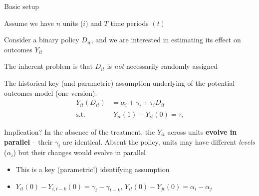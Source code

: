 \documentclass[notes,11pt, aspectratio=169]{beamer}
\newenvironment{wideitemize}{\itemize\addtolength{\itemsep}{10pt}}{\enditemize}
\begin{document}
\begin{frame}{Basic setup }
  \begin{wideitemize}
  \item Assume we have $n$ units ($i$) and $T$ time periods $(t)$
  \item Consider a binary policy $D_{it}$, and we are interested
    in estimating its effect on outcomes $Y_{it}$
  \item The inherent problem is that $D_{it}$ is \emph{not}
    necessarily randomly assigned
  \item The historical key (and parametric) assumption underlying of
    the potential outcomes model (one version):
    \begin{align*}
      Y_{it}(D_{it}) &= \alpha_{i} + \gamma_{t} + \tau_{i}D_{it}\\
      \text{s.t.} &\; Y_{it}(1) - Y_{it}(0)=  \tau_{i}
    \end{align*}
  \item Implication? In the absence of the treatment, the $Y_{it}$
    across units \textbf{evolve in parallel} -- their $\gamma_{t}$ are
    identical. Absent the policy, units may have different
    \emph{levels} ($\alpha_{i}$) but their changes would evolve in
    parallel
    \begin{itemize}
    \item This is a key (parametric!) identifying assumption
    \item $Y_{it}(0) - Y_{i,t-k}(0) = \gamma_{t} - \gamma_{t-k}$, $Y_{it}(0) - Y_{jt}(0) = \alpha_{i} -\alpha_{j}$
    \end{itemize}
  \end{wideitemize}
\end{frame}
\end{document}
